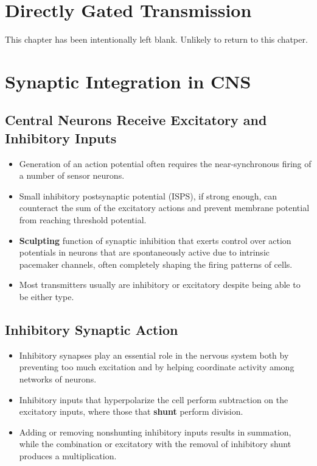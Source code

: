 \documentclass[12pt,a4paper]{article}
\begin{document}
\clearpage
\section{Directly Gated Transmission}   
\begin{center}
    This chapter has been intentionally left blank. Unlikely to return to this chatper.
\end{center}

\clearpage
\section{Synaptic Integration in CNS}
\subsection{Central Neurons Receive Excitatory and Inhibitory Inputs}
\begin{itemize}
    \item Generation of an action potential often requires the near-synchronous firing of a number of sensor neurons.
    \item Small inhibitory postsynaptic potential (ISPS), if strong enough, can counteract the sum of the excitatory actions and prevent membrane potential from reaching threshold potential.
    \item \textbf{Sculpting} function of synaptic inhibition that exerts control over action potentials in neurons that are spontaneously active due to intrinsic pacemaker channels, often completely shaping the firing patterns of cells.
    \item Most transmitters usually are inhibitory or excitatory despite being able to be either type. 
\end{itemize}

\subsection{Inhibitory Synaptic Action}
\begin{itemize}
    \item Inhibitory synapses play an essential role in the nervous system both by preventing too much excitation and by helping coordinate activity among networks of neurons. 
    \item Inhibitory inputs that hyperpolarize the cell perform subtraction on the excitatory inputs, where those that \textbf{shunt} perform division. 
    \item Adding or removing nonshunting inhibitory inputs results in summation, while the combination or excitatory with the removal of inhibitory shunt produces a multiplication.
\end{itemize}
\end{document}
